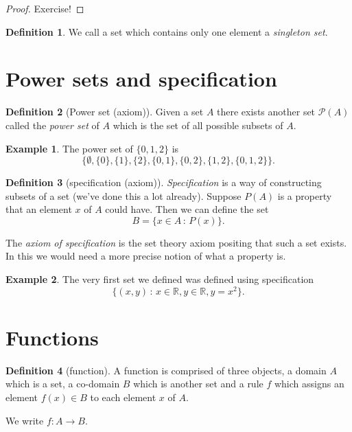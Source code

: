 \documentclass[
]{book}
\theoremstyle{definition}
\newtheorem{definition}{Definition}[chapter]
\theoremstyle{definition}
\newtheorem{example}{Example}[chapter]
\theoremstyle{definition}
\theoremstyle{definition}
\theoremstyle{remark}
\begin{document}
\begin{proof}
Exercise!
\end{proof}

\begin{definition}
We call a set which contains only one element a \emph{singleton set}.
\end{definition}

\section{Power sets and specification}\label{power-sets-and-specification}

\begin{definition}[Power set (axiom)]
Given a set \(A\) there exists another set \(\mathcal{P}(A)\) called the \emph{power set} of \(A\) which is the set of all possible subsets of \(A\).
\end{definition}

\begin{example}
The power set of \(\{0,1,2\}\) is
\[ \{ \emptyset, \{0\}, \{1\}, \{2\}, \{0,1\}, \{0,2\}, \{1,2\}, \{0,1,2\}\}.  \]
\end{example}

\begin{definition}[specification (axiom)]
\emph{Specification} is a way of constructing subsets of a set (we've done this a lot already). Suppose \(P(A)\) is a property that an element \(x\) of \(A\) could have. Then we can define the set
\[ B = \{ x \in A \,:\, P(x)\}.  \]
\end{definition}

The \emph{axiom of specification} is the set theory axiom positing that such a set exists. In this we would need a more precise notion of what a property is.

\begin{example}
The very first set we defined was defined using specification
\[ \{(x, y)\,:\, x \in \mathbb{R}, y \in \mathbb{R}, y=x^2\}.  \]
\end{example}

\section{Functions}\label{functions}

\begin{definition}[function]
A function is comprised of three objects, a domain \(A\) which is a set, a co-domain \(B\) which is another set and a rule \(f\) which assigns an element \(f(x) \in B\) to each element \(x\) of \(A\).

We write \(f: A \rightarrow B\).
\end{definition}
\end{document}
